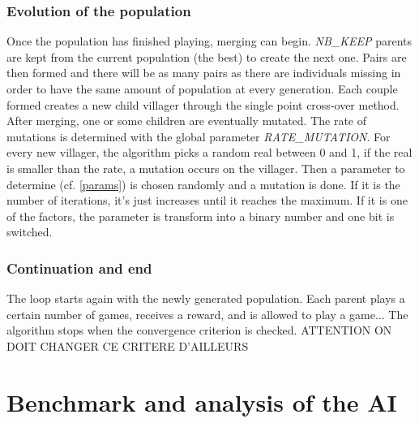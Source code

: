\documentclass[11pt,a4paper]{article}
\begin{document}
\subsubsection{Evolution of the population}
Once the population has finished playing, merging can begin. \textit{NB\_KEEP} parents are kept from the current population (the best) to create the next one. Pairs are then formed and there will be as many pairs as there are individuals missing in order to have the same amount of population at every generation. Each couple formed creates a new child villager through the single point cross-over method.\\
After merging, one or some children are eventually mutated. The rate of mutations is determined with the global parameter \textit{RATE\_MUTATION}. For every new villager, the algorithm picks a random real between 0 and 1, if the real is smaller than the rate, a mutation occurs on the villager. Then a parameter to determine (cf. \ref{params})
is chosen randomly and a mutation is done. If it is the number of iterations, it's just increases until it reaches the maximum. If it is one of the factors, the parameter is transform into a binary number and one bit is switched.
\subsubsection{Continuation and end}
The loop starts again with the newly generated population. Each parent plays a certain number of games, receives a reward, and is allowed to play a game... The algorithm stops when the convergence criterion is checked. 
ATTENTION ON DOIT CHANGER CE CRITERE D'AILLEURS
\section{Benchmark and analysis of the AI}

\end{document}
